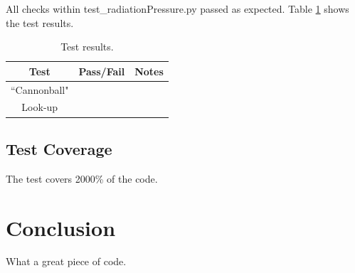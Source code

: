 \documentclass[]{BasiliskReportMemo}
\newcommand{\testname}{test\_radiationPressure.py }
\begin{document}
All checks within \testname passed as expected. Table \ref{tab:results} shows the test results.

\begin{table}[htbp]
	\caption{Test results.}
	\label{tab:results}
	\centering \fontsize{10}{10}\selectfont
	\begin{tabular}{c | c | c  } %
		\hline
		\textbf{Test} 				      & \textbf{Pass/Fail} 						   		   & \textbf{Notes} 									\\ \hline
		``Cannonball"	   			  	&      & 	 \\ \hline
		Look-up	   	                     &              &            \\ \hline
	\end{tabular}
\end{table}

\subsection{Test Coverage}
The test covers 2000\% of the code.
\section{Conclusion}
What a great piece of code.
\end{document}
